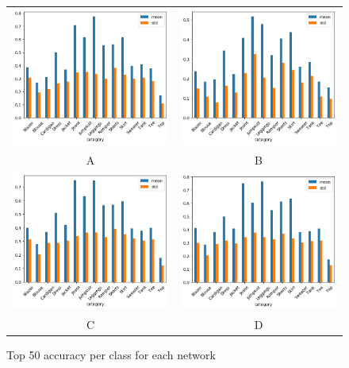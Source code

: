 \documentclass{article}
\begin{document}
\begin{figure}
\begin{tabular}{cc}
{\includegraphics[width = 2.5in]{acc_plots/A_acc.png}} &
{\includegraphics[width = 2.5in]{acc_plots/B_100_acc.png}} \\
A & B \\[6pt]
{\includegraphics[width = 2.5in]{acc_plots/C_100_acc.png}} &
{\includegraphics[width = 2.5in]{acc_plots/D_acc.png}} \\
C & D \\[6pt]
\end{tabular}
\caption{Top 50 accuracy per class for each network}
\label{fig:img_netD}
\end{figure}
\end{document}
